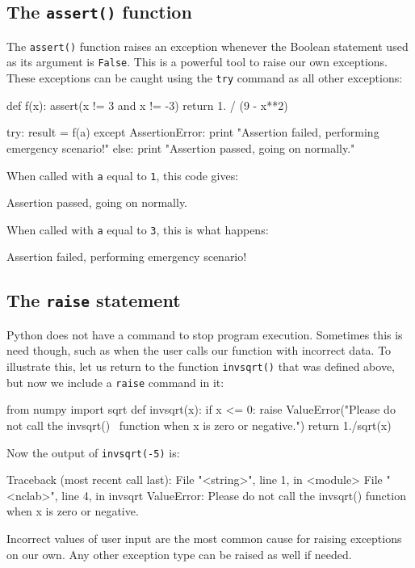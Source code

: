 \subsection{The {\tt assert()} function}

The {\tt assert()} function raises an exception whenever the Boolean 
statement used as its argument is {\tt False}. This is a powerful tool to raise our own 
exceptions. These exceptions can be caught using the {\tt try} command 
as all other exceptions:

\begin{bluecode}
def f(x):
    assert(x != 3 and x != -3)
    return 1. / (9 - x**2)

try:
    result = f(a)
except AssertionError:
    print "Assertion failed, performing emergency scenario!"
else:
    print "Assertion passed, going on normally."
\end{bluecode}
When called with {\tt a} equal to {\tt 1}, this code gives:

\begin{bluecode}
Assertion passed, going on normally.
\end{bluecode}
When called with {\tt a} equal to {\tt 3}, this is what happens:

\begin{bluecode}
Assertion failed, performing emergency scenario!
\end{bluecode}

\subsection{The {\tt raise} statement}

Python does not have a command to stop program execution. Sometimes this is
need though, such as when the user calls our function with incorrect data. 
To illustrate this, let us return to the function {\tt invsqrt()} that was 
defined above, but now we include a {\tt raise} command in it:
 
\begin{bluecode}
from numpy import sqrt
def invsqrt(x):
    if x <= 0:
      raise ValueError("Please do not call the invsqrt() \
function when x is zero or negative.")
    return 1./sqrt(x)
\end{bluecode}
Now the output of {\tt invsqrt(-5)} is:

\begin{redcode}
Traceback (most recent call last):
  File "<string>", line 1, in <module>
  File "<nclab>", line 4, in invsqrt
ValueError: Please do not call the invsqrt() 
function when x is zero or negative.
\end{redcode}
Incorrect values of user input are the most common cause for raising 
exceptions on our own. Any other exception type can be raised as well
if needed.

